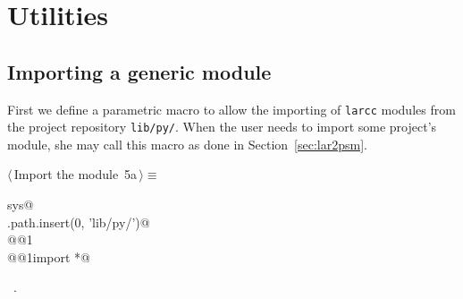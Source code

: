 \documentclass[11pt,oneside]{article}	%
\begin{document}
\appendix
\section{Utilities}

\subsection{Importing a generic module}
First we define a parametric macro to allow the importing of \texttt{larcc} modules from the project repository \texttt{lib/py/}. When the user needs to import some project's module, she may call this macro as done in Section~\ref{sec:lar2psm}.
\begin{flushleft} \small
\begin{minipage}{\linewidth} \label{scrap9}
\protect{}$\langle\,$Import the module\nobreak\ {\footnotesize 5a}$\,\rangle\equiv$
\vspace{-1ex}
\begin{list}{}{} \item
\mbox{}\verb@import sys@\\
\mbox{}\verb@sys.path.insert(0, 'lib/py/')@\\
\mbox{}\verb@import @@1\verb@@\\
\mbox{}\verb@from @@1\verb@ import *@\\
\mbox{}\verb@@{\NWsep}
\end{list}
\vspace{-1ex}
\footnotesize\addtolength{\baselineskip}{-1ex}
\begin{list}{}{\setlength{\itemsep}{-\parsep}\setlength{\itemindent}{-\leftmargin}}
\item \NWtxtMacroRefIn\ .
\end{list}
\end{minipage}\\[4ex]
\end{flushleft}
\end{document}
